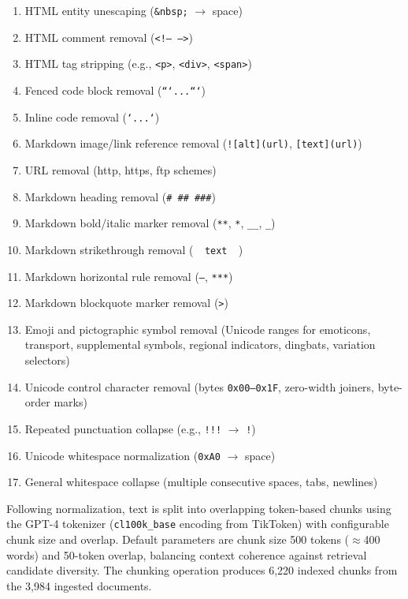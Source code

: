 \begin{enumerate}[leftmargin=0.5in, font=\small]
  \item HTML entity unescaping (\texttt{\&nbsp;} $\to$ space)
  \item HTML comment removal (\texttt{<!-- -->})
  \item HTML tag stripping (e.g., \texttt{<p>}, \texttt{<div>}, \texttt{<span>})
  \item Fenced code block removal (\texttt{```...```})
  \item Inline code removal (\texttt{`...`})
  \item Markdown image/link reference removal (\texttt{![alt](url)}, \texttt{[text](url)})
  \item URL removal (http, https, ftp schemes)
  \item Markdown heading removal (\texttt{\# \#\# \#\#\#})
  \item Markdown bold/italic marker removal (\texttt{**}, \texttt{*}, \texttt{\_\_}, \texttt{\_})
  \item Markdown strikethrough removal (\texttt{~~text~~})
  \item Markdown horizontal rule removal (\texttt{---}, \texttt{***})
  \item Markdown blockquote marker removal (\texttt{>})
  \item Emoji and pictographic symbol removal (Unicode ranges for emoticons, transport, supplemental symbols, regional indicators, dingbats, variation selectors)
  \item Unicode control character removal (bytes \texttt{0x00--0x1F}, zero-width joiners, byte-order marks)
  \item Repeated punctuation collapse (e.g., \texttt{!!!} $\to$ \texttt{!})
  \item Unicode whitespace normalization (\texttt{0xA0} $\to$ space)
  \item General whitespace collapse (multiple consecutive spaces, tabs, newlines)
\end{enumerate}

Following normalization, text is split into overlapping token-based chunks using the GPT-4 tokenizer (\texttt{cl100k\_base} encoding from TikToken) with configurable chunk size and overlap. Default parameters are chunk size 500 tokens ($\approx$400 words) and 50-token overlap, balancing context coherence against retrieval candidate diversity. The chunking operation produces 6{,}220 indexed chunks from the 3{,}984 ingested documents.

